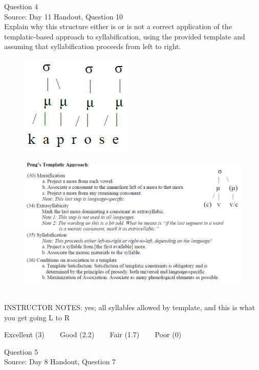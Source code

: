 \documentclass[12pt]{article}
\begin{document}
{\large Question 4}\\

Source: Day 11 Handout, Question 10\\

Explain why this structure either is or is not a correct application of the templatic-based approach to syllabification, using the provided template and assuming that syllabification proceeds from left to right.\\

\begin{figure}[H]
\includegraphics{../images/pengtemplate_kaprose_yes.png}
\end{figure}
\begin{figure}[H]
\includegraphics{../images/peng_template_withdiagram.png}
\end{figure}

~\\
INSTRUCTOR NOTES: yes; all syllables allowed by template, and this is what you get going L to R


\vfill
Excellent (3) ~~~ Good (2.2) ~~~ Fair (1.7) ~~~ Poor (0)
\newpage

{\large Question 5}\\

Source: Day 8 Handout, Question 7\\
\end{document}

